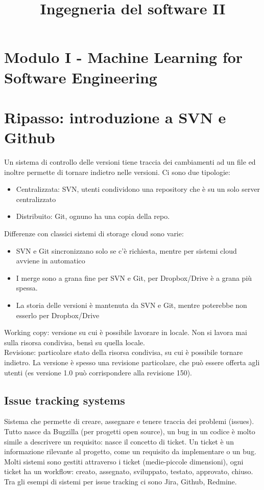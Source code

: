 \documentclass{article}
\title{Ingegneria del software II}
\begin{document}
\Large
\tableofcontents
\section{Modulo I - Machine Learning for Software Engineering}
\section{Ripasso: introduzione a SVN e Github}
Un sistema di controllo delle versioni tiene traccia dei cambiamenti ad un file ed inoltre permette di tornare indietro nelle versioni. Ci sono due tipologie:
\begin{itemize}
\item Centralizzata: SVN, utenti condividono una repository che è su un solo server centralizzato
\item Distribuito: Git, ognuno ha una copia della repo.
\end{itemize}
Differenze con classici sistemi di storage cloud sono varie:
\begin{itemize}
\item SVN e Git sincronizzano solo se c'è richiesta, mentre per sistemi cloud avviene in automatico
\item I merge sono a grana fine per SVN e Git, per Dropbox/Drive è a grana più spessa.
\item La storia delle versioni è mantenuta da SVN e Git, mentre poterebbe non esserlo per Dropbox/Drive
\end{itemize}
Working copy: versione su cui è possibile lavorare in locale. Non si lavora mai sulla risorsa condivisa, bensì su quella locale. \\ Revisione: particolare stato della risorsa condivisa, su cui è possibile tornare indietro. La versione è spesso una revisione particolare, che può essere offerta agli utenti (es versione 1.0 può corrispondere alla revisione 150).
\subsection{Issue tracking systems}
Sistema che permette di creare, assegnare e tenere traccia dei problemi (issues). Tutto nasce da Bugzilla (per progetti open source), un bug in un codice è molto simile a descrivere un requisito: nasce il concetto di ticket. Un ticket è un informazione rilevante al progetto, come un requisito da implementare o un bug.\\ Molti sistemi sono gestiti attraverso i ticket (medie-piccole dimensioni), ogni ticket ha un workflow: creato, assegnato, sviluppato, testato, approvato, chiuso. Tra gli esempi di sistemi per issue tracking ci sono Jira, Github, Redmine.
\end{document}
